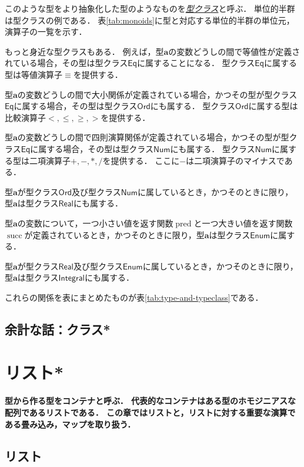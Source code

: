 \documentclass[twocolumn]{jsbook}
\newcommand{\keyword}[1]{\underline{\emph{#1}}}
\newenvironment{leader}{\begingroup\bf}{\endgroup}
\newcommand{\hsklType}[1]{\textbf{#1}}
\newcommand{\hsklTypeclass}[1]{\mathsf{#1}}
\DeclareMathOperator{\hsklPred}{pred}
\DeclareMathOperator{\hsklSucc}{succ}
\newcommand{\hsklEnum}{\hsklTypeclass{Enum}}
\newcommand{\hsklIntegral}{\hsklTypeclass{Integral}}
\newcommand{\hsklEq}{\hsklTypeclass{Eq}}
\newcommand{\hsklNum}{\hsklTypeclass{Num}}
\newcommand{\hsklOrd}{\hsklTypeclass{Ord}}
\newcommand{\hsklReal}{\hsklTypeclass{Real}}
\begin{document}
このような型をより抽象化した型のようなものを\keyword{型クラス}と呼ぶ．
単位的半群は型クラスの例である．
表\ref{tab:monoids}に型と対応する単位的半群の単位元，演算子の一覧を示す．

もっと身近な型クラスもある．
例えば，型$\hsklType{a}$の変数どうしの間で等値性が定義されている場合，その型は型クラス$\hsklEq$に属することになる．
型クラス$\hsklEq$に属する型は等値演算子$\equiv$を提供する．

型$\hsklType{a}$の変数どうしの間で大小関係が定義されている場合，かつその型が型クラス$\hsklEq$に属する場合，その型は型クラス$\hsklOrd$にも属する．
型クラス$\hsklOrd$に属する型は比較演算子$<,\le,\ge,>$を提供する．

型$\hsklType{a}$の変数どうしの間で四則演算関係が定義されている場合，かつその型が型クラス$\hsklEq$に属する場合，その型は型クラス$\hsklNum$にも属する．
型クラス$\hsklNum$に属する型は二項演算子$+,-,*,/$を提供する．
ここに$-$は二項演算子のマイナスである．

型$\hsklType{a}$が型クラス$\hsklOrd$及び型クラス$\hsklNum$に属しているとき，かつそのときに限り，型$\hsklType{a}$は型クラス$\hsklReal$にも属する．

型$\hsklType{a}$の変数について，一つ小さい値を返す関数$\hsklPred$と一つ大きい値を返す関数$\hsklSucc$が定義されているとき，かつそのときに限り，型$\hsklType{a}$は型クラス$\hsklEnum$に属する．

型$\hsklType{a}$が型クラス$\hsklReal$及び型クラス$\hsklEnum$に属しているとき，かつそのときに限り，型$\hsklType{a}$は型クラス$\hsklIntegral$にも属する．

これらの関係を表にまとめたものが表\ref{tab:type-and-typeclass}である．



\section*{余計な話：クラス*}

\chapter{リスト*}

\begin{leader}
型から作る型をコンテナと呼ぶ．
代表的なコンテナはある型のホモジニアスな配列であるリストである．
この章ではリストと，リストに対する重要な演算である畳み込み，マップを取り扱う．
\end{leader}

\section{リスト}
\end{document}
